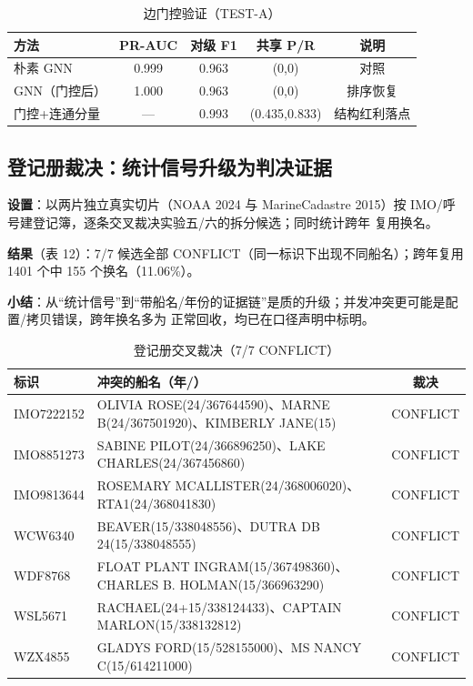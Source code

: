 \documentclass[10.5pt,a4paper]{ctexart}
\newcommand{\mmsi}{\text{MMSI}}
\begin{document}
\begin{table}[htbp]\centering\small
\caption{边门控验证（TEST-A）}\label{t11}
\begin{tabular}{lcccc}
\toprule
方法 & PR-AUC & 对级 F1 & 共享 P/R & 说明\\
\midrule
朴素 GNN & 0.999 & 0.963 & (0,0) & 对照\\
GNN（门控后） & 1.000 & 0.963 & (0,0) & 排序恢复\\
门控+连通分量 & --- & 0.993 & (0.435,0.833) & 结构红利落点\\
\bottomrule
\end{tabular}
\end{table}

\subsection{登记册裁决：统计信号升级为判决证据}
\textbf{设置}：以两片独立真实切片（NOAA 2024 与 MarineCadastre 2015）按 IMO/呼号建登记簿，逐条交叉裁决实验五/六的拆分候选；同时统计跨年 \mmsi{} 复用换名。

\textbf{结果}（表 12）：7/7 候选全部 CONFLICT（同一标识下出现不同船名）；跨年复用 \mmsi{} 1401 个中 155 个换名（11.06\%）。

\textbf{小结}：从``统计信号''到``带船名/年份的证据链''是质的升级；并发冲突更可能是配置/拷贝错误，跨年换名多为 \mmsi{} 正常回收，均已在口径声明中标明。

\begin{table}[htbp]\centering\scriptsize
\caption{登记册交叉裁决（7/7 CONFLICT）}\label{t12}
\begin{tabular}{@{}p{1.7cm}p{10.8cm}c@{}}
\toprule
标识 & 冲突的船名（年/\mmsi{}） & 裁决\\
\midrule
IMO7222152 & OLIVIA ROSE(24/367644590)、MARNE B(24/367501920)、KIMBERLY JANE(15) & CONFLICT\\
IMO8851273 & SABINE PILOT(24/366896250)、LAKE CHARLES(24/367456860) & CONFLICT\\
IMO9813644 & ROSEMARY MCALLISTER(24/368006020)、RTA1(24/368041830) & CONFLICT\\
WCW6340 & BEAVER(15/338048556)、DUTRA DB 24(15/338048555) & CONFLICT\\
WDF8768 & FLOAT PLANT INGRAM(15/367498360)、CHARLES B. HOLMAN(15/366963290) & CONFLICT\\
WSL5671 & RACHAEL(24+15/338124433)、CAPTAIN MARLON(15/338132812) & CONFLICT\\
WZX4855 & GLADYS FORD(15/528155000)、MS NANCY C(15/614211000) & CONFLICT\\
\bottomrule
\end{tabular}
\end{table}
\end{document}
